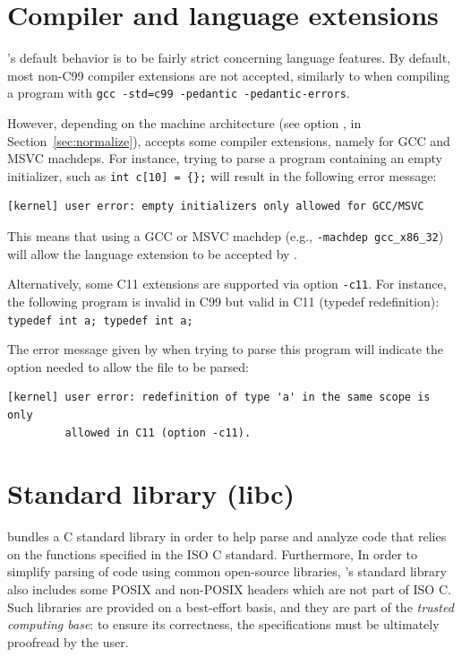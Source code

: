 \section{Compiler and language extensions}\label{sec:extensions}

\FramaC's default behavior is to be fairly strict concerning language features.
By default, most non-C99 compiler extensions are not accepted, similarly to
when compiling a program with \verb+gcc -std=c99 -pedantic -pedantic-errors+.

However, depending on the machine architecture (see option
, in Section~\ref{sec:normalize}),
\FramaC accepts some compiler extensions, namely for GCC and MSVC machdeps.
For instance, trying to parse a program containing an empty initializer,
such as \verb+int c[10] = {};+ will result in the following error message:

\begin{verbatim}
[kernel] user error: empty initializers only allowed for GCC/MSVC
\end{verbatim}

This means that using a GCC or MSVC machdep (e.g., \verb+-machdep gcc_x86_32+)
will allow the language extension to be accepted by \FramaC.

Alternatively, some C11 extensions are supported via option \verb+-c11+.
For instance, the following program is invalid in C99 but valid in C11
(typedef redefinition): \lstinline|typedef int a; typedef int a;|

The error message given by \FramaC when trying to parse this program will
indicate the option needed to allow the file to be parsed:

\begin{verbatim}
[kernel] user error: redefinition of type 'a' in the same scope is only
         allowed in C11 (option -c11).
\end{verbatim}

\section{Standard library (libc)}\label{sec:libc}

\FramaC bundles a C standard library in order to help parse and analyze code
that relies on the functions specified in the ISO C standard.
Furthermore, In order to simplify parsing of code using common open-source libraries,
\FramaC's standard library also includes some POSIX and non-POSIX headers which
are not part of ISO C.
Such libraries are provided on a best-effort basis, and they are part of the
{\em trusted computing base}: to ensure its correctness, the specifications
must be ultimately proofread by the user.

